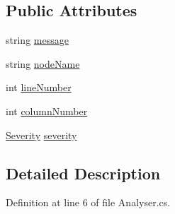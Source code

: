 \subsection*{Public Attributes}
\begin{DoxyCompactItemize}
\item 
string \hyperlink{a00085_ac7ed070dddd2613c08e7874ea5afb3af}{message}
\item 
string \hyperlink{a00085_a662aca4ad2af5116c2cf6773daf1a847}{node\-Name}
\item 
int \hyperlink{a00085_a0bd73f1c684bfd66ae7b6bef8f2972d0}{line\-Number}
\item 
int \hyperlink{a00085_a658e7fb05555c0f9ab5f80057bdc1408}{column\-Number}
\item 
\hyperlink{a00085_a227813cbc8fa03c3448a612ffc909d1c}{Severity} \hyperlink{a00085_ad90ffa839ce0f568a099bb37b4a6c4da}{severity}
\end{DoxyCompactItemize}


\subsection{Detailed Description}


Definition at line 6 of file Analyser.\-cs.




